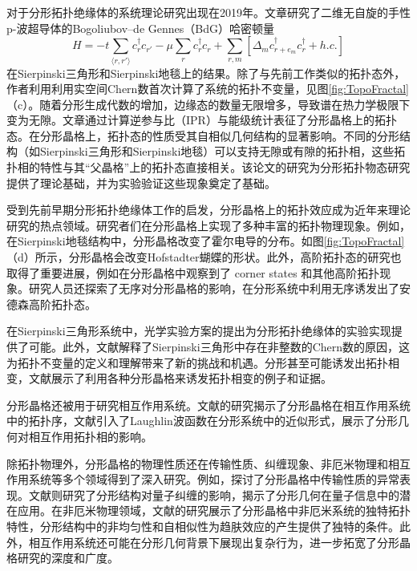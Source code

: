 对于分形拓扑绝缘体的系统理论研究出现在2019年\cite{pai2019topological}。文章研究了二维无自旋的手性p-波超导体的Bogoliubov–de Gennes（BdG）哈密顿量
\begin{equation}
    H = -t \sum_{\langle r, r' \rangle} c_r^\dagger c_{r'} - \mu \sum_{r} c_r^\dagger c_r + \sum_{r, m} \left[ \Delta_m c_{r+e_m}^\dagger c_r^\dagger + h.c. \right]
\end{equation}
在Sierpinski三角形和Sierpinski地毯上的结果。除了与先前工作类似的拓扑态外，作者利用利用实空间Chern数首次计算了系统的拓扑不变量，见图\ref{fig:TopoFractal}（c）。随着分形生成代数的增加，边缘态的数量无限增多，导致谱在热力学极限下变为无隙。文章通过计算逆参与比（IPR）与能级统计表征了分形晶格上的拓扑态。在分形晶格上，拓扑态的性质受其自相似几何结构的显著影响。不同的分形结构（如Sierpinski三角形和Sierpinski地毯）可以支持无隙或有隙的拓扑相，这些拓扑相的特性与其“父晶格”上的拓扑态直接相关。该论文的研究为分形拓扑物态研究提供了理论基础，并为实验验证这些现象奠定了基础。

受到先前早期分形拓扑绝缘体工作的启发，分形晶格上的拓扑效应成为近年来理论研究的热点领域。研究者们在分形晶格上实现了多种丰富的拓扑物理现象。例如，在Sierpinski地毯结构中，分形晶格改变了霍尔电导的分布\cite{fremling2020existence, iliasov2020hall}。如图\ref{fig:TopoFractal}（d）所示，分形晶格会改变Hofstadter蝴蝶的形状。此外，高阶拓扑态的研究也取得了重要进展，例如在分形晶格中观察到了 corner states 和其他高阶拓扑现象\cite{manna2022higher,lage2024corner}。研究人员还探索了无序对分形晶格的影响，在分形系统中利用无序诱发出了安德森高阶拓扑态\cite{chen2023higher}。

在Sierpinski三角形系统中，光学实验方案的提出为分形拓扑绝缘体的实验实现提供了可能\cite{yang2020photonic}。此外，文献\cite{chen2023kitaev}解释了Sierpinski三角形中存在非整数的Chern数的原因，这为拓扑不变量的定义和理解带来了新的挑战和机遇。分形甚至可能诱发出拓扑相变，文献\cite{eek2024fractality}展示了利用各种分形晶格来诱发拓扑相变的例子和证据。

分形晶格还被用于研究相互作用系统。文献\cite{wang2022new}的研究揭示了分形晶格在相互作用系统中的拓扑序，文献\cite{jaworowski2023approximate}引入了Laughlin波函数在分形系统中的近似形式，展示了分形几何对相互作用拓扑相的影响。

除拓扑物理外，分形晶格的物理性质还在传输性质、纠缠现象、非厄米物理和相互作用系统等多个领域得到了深入研究。例如，\cite{guglielmon2019inducing, rojo2024anomalous}探讨了分形晶格中传输性质的异常表现。文献\cite{zhou2024entanglement}则研究了分形结构对量子纠缠的影响，揭示了分形几何在量子信息中的潜在应用。在非厄米物理领域，文献\cite{sun2024non,manna2023inner}的研究展示了分形晶格中非厄米系统的独特拓扑特性，分形结构中的非均匀性和自相似性为趋肤效应的产生提供了独特的条件。此外，相互作用系统还可能在分形几何背景下展现出复杂行为\cite{conte2024fractal}，进一步拓宽了分形晶格研究的深度和广度。

